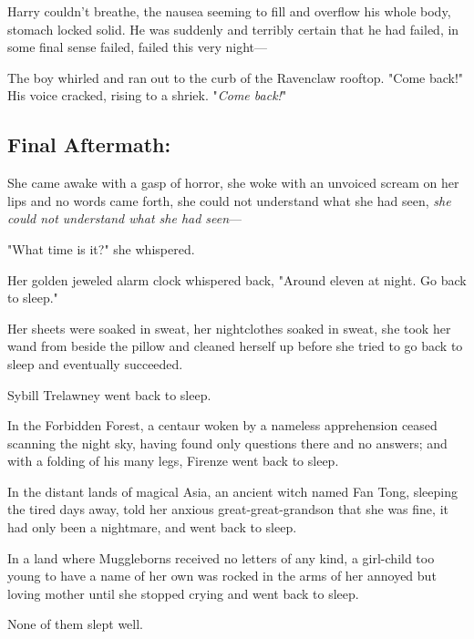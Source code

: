 Harry couldn't breathe, the nausea seeming to fill and overflow his whole body, 
stomach locked solid. He was suddenly and terribly certain that he had failed, 
in some final sense failed, failed this very night---

The boy whirled and ran out to the curb of the Ravenclaw rooftop. "Come back!" 
His voice cracked, rising to a shriek. "\emph{Come back!}"
\sbreak
\vspace{-2\baselineskip}
\subsection{Final Aftermath:}

She came awake with a gasp of horror, she woke with an unvoiced scream on her 
lips and no words came forth, she could not understand what she had seen, 
\emph{she could not understand what she had seen}---

"What time is it?" she whispered.

Her golden jeweled alarm clock whispered back, "Around eleven at night. Go back 
to sleep."

Her sheets were soaked in sweat, her nightclothes soaked in sweat, she took her 
wand from beside the pillow and cleaned herself up before she tried to go back 
to sleep and eventually succeeded.

Sybill Trelawney went back to sleep.

In the Forbidden Forest, a centaur woken by a nameless apprehension ceased 
scanning the night sky, having found only questions there and no answers; and 
with a folding of his many legs, Firenze went back to sleep.

In the distant lands of magical Asia, an ancient witch named Fan Tong, sleeping 
the tired days away, told her anxious great-great-grandson that she was fine, 
it had only been a nightmare, and went back to sleep.

In a land where Muggleborns received no letters of any kind, a girl-child too 
young to have a name of her own was rocked in the arms of her annoyed but 
loving mother until she stopped crying and went back to sleep.

None of them slept well.
